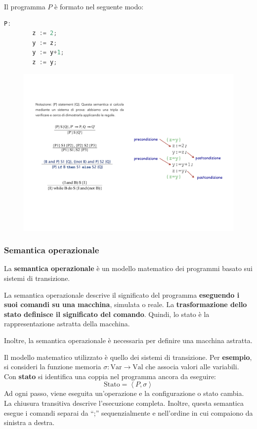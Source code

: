 \documentclass[a4paper]{article}
\newcommand{\dquotes}[1]{``#1''}
\begin{document}
	\noindent
	Il programma $P$ è formato nel seguente modo:
	\begin{lstlisting}[language=C]
		P:
		z := 2;
		y := z;
		y := y+1;
		z := y;\end{lstlisting}
	\begin{figure}[!htp]
		\centering
		\includegraphics[width=\textwidth]{img/eg-semantica_assiomatica.pdf}
	\end{figure}\newpage

	\subsubsection{Semantica operazionale}
	
	\begin{boxdef}
		La \textcolor{Red3}{\textbf{semantica operazionale}} è un modello matematico dei programmi basato sui sistemi di transizione.
	\end{boxdef}
	
	\noindent
	La semantica operazionale descrive il significato del programma \textbf{eseguendo i suoi comandi su una macchina}, simulata o reale. La \textbf{trasformazione dello stato definisce il significato del comando}. Quindi, lo stato è la rappresentazione astratta della macchina.
	
	Inoltre, la semantica operazionale è necessaria per definire una macchina astratta.\newline
	
	\noindent
	Il modello matematico utilizzato è quello dei sistemi di transizione. Per \textcolor{Green4}{\textbf{esempio}}, si consideri la funzione memoria $\sigma: \mathrm{Var} \rightarrow \mathrm{Val}$ che associa valori alle variabili. Con \textbf{stato} si identifica una coppia nel programma ancora da eseguire:
	\begin{equation*}
		\mathrm{Stato} = \left\langle P,\sigma \right\rangle
	\end{equation*}
	Ad ogni passo, viene eseguita un'operazione e la configurazione o stato cambia. La chiusura transitiva descrive l'esecuzione completa.\newline
	Inoltre, questa semantica esegue i comandi separai da \dquotes{;} sequenzialmente e nell'ordine in cui compaiono da sinistra a destra.
	
\end{document}
